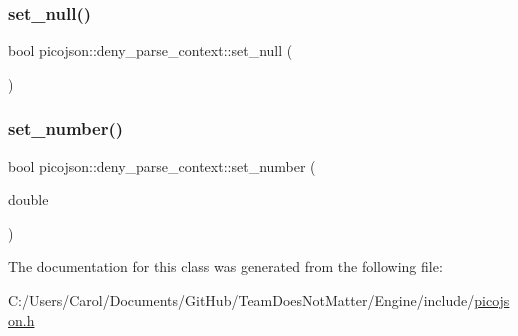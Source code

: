 \subsubsection{\texorpdfstring{set\+\_\+null()}{set\_null()}}
{\footnotesize\ttfamily bool picojson\+::deny\+\_\+parse\+\_\+context\+::set\+\_\+null (\begin{DoxyParamCaption}{ }\end{DoxyParamCaption})\hspace{0.3cm}{\ttfamily [inline]}}

\hypertarget{classpicojson_1_1deny__parse__context_aec324fbb7fea546b6e0673724873e1e1}{}\label{classpicojson_1_1deny__parse__context_aec324fbb7fea546b6e0673724873e1e1} 
\subsubsection{\texorpdfstring{set\+\_\+number()}{set\_number()}}
{\footnotesize\ttfamily bool picojson\+::deny\+\_\+parse\+\_\+context\+::set\+\_\+number (\begin{DoxyParamCaption}\item[{double}]{ }\end{DoxyParamCaption})\hspace{0.3cm}{\ttfamily [inline]}}



The documentation for this class was generated from the following file\+:\begin{DoxyCompactItemize}
\item 
C\+:/\+Users/\+Carol/\+Documents/\+Git\+Hub/\+Team\+Does\+Not\+Matter/\+Engine/include/\hyperlink{picojson_8h}{picojson.\+h}\end{DoxyCompactItemize}
